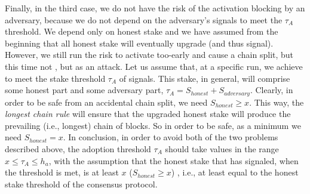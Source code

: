 {Finally, in the third case, we do not have the risk of the activation blocking by an adversary, because we do not depend on the adversary's signals to meet the $\tau_A$ threshold. We depend only on honest stake and we have assumed from the beginning that all honest stake will eventually upgrade (and thus signal). However, we still run the risk to activate too-early and cause a chain split, but this time not , but as an attack. Let us assume that, at a specific run, we achieve to meet the stake threshold $\tau_A$ of signals. This stake, in general, will comprise some honest part and some adversary part, $\tau_A = S_{honest} + S_{adversary}$. Clearly, in order to be safe from an accidental chain split, we need $S_{honest} \geq x$. This way, the \emph{longest chain rule} will ensure that the upgraded honest stake will produce the prevailing (i.e., longest) chain of blocks. So in order to be safe, as a minimum we need $S_{honest} = x$. In conclusion, in order to avoid both of the two problems described above, the adoption threshold $\tau_A$ should take values in the range $x \leq \tau_A \leq h_a$, with the assumption that the honest stake that has signaled, when the threshold is met, is at least $x$ ($S_{honest} \geq x$) , i.e., at least equal to the honest stake threshold of the consensus protocol.
}

 
